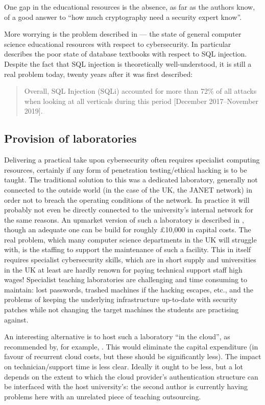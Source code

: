 \documentclass[conference]{IEEEtran}
\begin{document}
One gap in the educational resources is the absence, as far as the authors know, of a good answer to ``how much cryptography need a security expert know''. 

More worrying is the problem described in \cite[\S IV.B]{Cricketal2019} --- the state of general computer science educational resources with respect to cybersecurity. In particular \cite{Drop2019} describes the poor state of database textbooks with respect to SQL injection.  Despite the fact that SQL injection is theoretically well-understood, it is still a real problem today, twenty years after it was first described: 
\begin{quote}
Overall,
SQL Injection (SQLi) accounted for more than 72\%
of all attacks when looking at all verticals during this
period [December 2017--November 2019]. \cite{Akamai2020a}
\end{quote}
\subsection{Provision of laboratories}
Delivering a practical take upon cybersecurity often requires specialist computing resources, certainly if any form of penetration testing/ethical hacking is to be taught. The traditional solution to this was a dedicated laboratory, generally not connected to the outside world (in the case of the UK, the JANET network)  in order not to breach the operating conditions of the network. In practice it will probably not even be directly connected to the university's internal network for the same reasons.  An upmarket version of such a laboratory is described in \cite{Abler2006}, though an adequate one can be build for roughly \pounds10,000 in capital costs.  The real problem, which many computer science departments in the UK will struggle with, is the staffing to support the maintenance of such a facility. This in itself requires specialist cybersecurity skills, which are in short supply and universities in the UK at least are hardly renown for paying technical support staff high wages! Specialist teaching laboratories are challenging and time consuming to maintain: lost passwords, trashed machines if the hacking escapes, etc., and the problems of keeping the underlying infrastructure up-to-date with security patches while not changing the target machines the students are practising against.

An interesting alternative is to host such a laboratory ``in the cloud'', as recommended by, for example, \cite{Salah2014a}. This would eliminate the capital expenditure (in favour of recurrent cloud costs, but these should be significantly less). The impact on technician/support time is less clear. Ideally it ought to be less, but a lot depends on the extent to which the cloud provider's authentication structure can be interfaced with the host university's: the second author is currently having problems here with an unrelated piece of teaching outsourcing.
\end{document}
